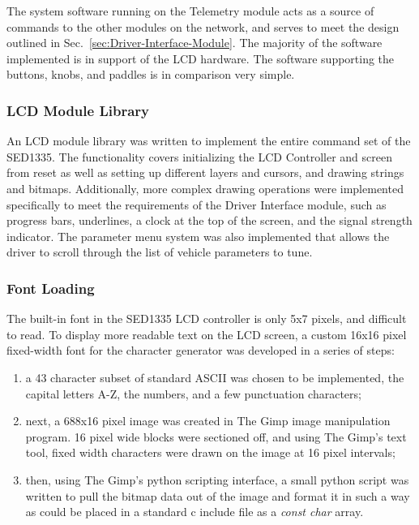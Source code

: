 The system software running on the Telemetry module acts as a source of commands to the other modules on the network, and serves to meet the design outlined in Sec.\ \ref{sec:Driver-Interface-Module}. The majority of the software implemented is in support of the LCD hardware. The software supporting the buttons, knobs, and paddles is in comparison very simple.

\subsubsection{LCD Module Library}

An LCD module library was written to implement the entire command set of the SED1335. The functionality covers initializing the LCD Controller and screen from reset as well as setting up different layers and cursors, and drawing strings and bitmaps. Additionally, more complex drawing operations were implemented specifically to meet the requirements of the Driver Interface module, such as progress bars, underlines, a clock at the top of the screen, and the signal strength indicator. The parameter menu system was also implemented that allows the driver to scroll through the list of vehicle parameters to tune.

\subsubsection{Font Loading}

The built-in font in the SED1335 LCD controller is only 5x7 pixels, and difficult to read. To display more readable text on the LCD screen, a custom 16x16 pixel fixed-width font for the character generator was developed in a series of steps:
\begin{enumerate}
 \item a 43 character subset of standard ASCII was chosen to be implemented, the capital letters A-Z, the numbers, and a few punctuation characters;
 \item next, a 688x16 pixel image was created in The Gimp image manipulation program. 16 pixel wide blocks were sectioned off, and using The Gimp's text tool, fixed width characters were drawn on the image at 16 pixel intervals;
  \item then, using The Gimp's python scripting interface, a small python script was written to pull the bitmap data out of the image and format it in such a way as could be placed in a standard c include file as a \emph{const char} array.
\end{enumerate}

